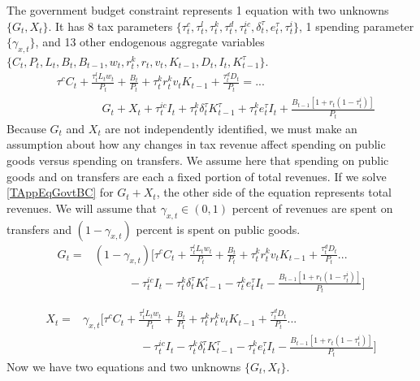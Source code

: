 \documentclass[article,11pt,letterpaper,fleqn]{article}
\theoremstyle{definition}
\numberwithin{equation}{section}
\begin{document}
The government budget constraint represents 1 equation with two unknowns $\{G_t,X_t\}$. It has 8 tax parameters $\{\tau_t^c,\tau_t^l,\tau_t^k,\tau_t^d,\tau_t^{ic},\delta_t^\tau,e_t^\tau,\tau_t^i\}$, 1 spending parameter $\{\gamma_{x,t}\}$, and 13 other endogenous aggregate variables $\{C_t,P_t,L_t,B_t,B_{t-1},w_t,r_t^k,r_t,v_t,K_{t-1},D_t,I_t,K_{t-1}^\tau\}$.
\begin{equation}\label{TAppEqGovtBC}
   \begin{split}
      &\tau^{c}C_t + \frac{\tau_{t}^{l}L_{t}w_{t}}{P_{t}} + \frac{B_{t}}{P_{t}} + \tau_{t}^{k}r_{t}^{k}v_{t}K_{t-1} + \frac{\tau_{t}^{d}D_{t}}{P_{t}} = ... \\
      &\quad\quad\quad\quad G_{t} + X_{t} + \tau_{t}^{ic}I_{t} + \tau_{t}^{k}\delta_{t}^{\tau}K_{t-1}^{\tau} + \tau_{t}^{k}e_{t}^{\tau}I_{t} + \frac{B_{t-1}\left[1+r_{t}(1-\tau_{t}^{i})\right]}{P_{t}}
   \end{split}
\end{equation}
Because $G_t$ and $X_t$ are not independently identified, we must make an assumption about how any changes in tax revenue affect spending on public goods versus spending on transfers. We assume here that spending on public goods and on transfers are each a fixed portion of total revenues. If we solve \eqref{TAppEqGovtBC} for $G_t + X_t$, the other side of the equation represents total revenues. We will assume that $\gamma_{x,t}\in(0,1)$ percent of revenues are spent on transfers and $(1-\gamma_{x,t})$ percent is spent on public goods.
\begin{equation}\label{TAppEqPubGood}
   \begin{split}
      G_t = &(1 - \gamma_{x,t})\Biggl[\tau^{c}C_t + \frac{\tau_{t}^{l}L_{t}w_{t}}{P_{t}} + \frac{B_{t}}{P_{t}} + \tau_{t}^{k}r_{t}^{k}v_{t}K_{t-1} + \frac{\tau_{t}^{d}D_{t}}{P_{t}} ... \\
      &\quad\quad\quad - \tau_{t}^{ic}I_{t} - \tau_{t}^{k}\delta_{t}^{\tau}K_{t-1}^{\tau} - \tau_{t}^{k}e_{t}^{\tau}I_{t} - \frac{B_{t-1}\left[1+r_{t}(1-\tau_{t}^{i})\right]}{P_{t}}\Biggr]
   \end{split}
\end{equation}

\begin{equation}\label{TAppEqTfer}
   \begin{split}
      X_t = &\gamma_{x,t}\Biggl[\tau^{c}C_t + \frac{\tau_{t}^{l}L_{t}w_{t}}{P_{t}} + \frac{B_{t}}{P_{t}} + \tau_{t}^{k}r_{t}^{k}v_{t}K_{t-1} + \frac{\tau_{t}^{d}D_{t}}{P_{t}} ... \\
      &\quad\quad\quad\quad\quad - \tau_{t}^{ic}I_{t} - \tau_{t}^{k}\delta_{t}^{\tau}K_{t-1}^{\tau} - \tau_{t}^{k}e_{t}^{\tau}I_{t} - \frac{B_{t-1}\left[1+r_{t}(1-\tau_{t}^{i})\right]}{P_{t}}\Biggr]
   \end{split}
\end{equation}
Now we have two equations and two unknowns $\{G_t,X_t\}$.
\end{document}
